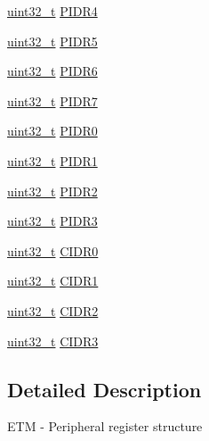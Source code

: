 \begin{DoxyCompactItemize}
\item 
\hyperlink{_p_e___types_8h_a33594304e786b158f3fb30289278f5af}{uint32\+\_\+t} \hyperlink{struct_e_t_m___mem_map_a5ee81b650eb5614f457473769ea8fb89}{P\+I\+D\+R4}
\item 
\hyperlink{_p_e___types_8h_a33594304e786b158f3fb30289278f5af}{uint32\+\_\+t} \hyperlink{struct_e_t_m___mem_map_abc897f6c82134908fb148e9283399e7c}{P\+I\+D\+R5}
\item 
\hyperlink{_p_e___types_8h_a33594304e786b158f3fb30289278f5af}{uint32\+\_\+t} \hyperlink{struct_e_t_m___mem_map_a2c8b019b70ddbec18c4ee65fa670f6f7}{P\+I\+D\+R6}
\item 
\hyperlink{_p_e___types_8h_a33594304e786b158f3fb30289278f5af}{uint32\+\_\+t} \hyperlink{struct_e_t_m___mem_map_ad50208a539be49c2689ceae20ad53af4}{P\+I\+D\+R7}
\item 
\hyperlink{_p_e___types_8h_a33594304e786b158f3fb30289278f5af}{uint32\+\_\+t} \hyperlink{struct_e_t_m___mem_map_a8e28324e300b4ce198839c4365ac2c19}{P\+I\+D\+R0}
\item 
\hyperlink{_p_e___types_8h_a33594304e786b158f3fb30289278f5af}{uint32\+\_\+t} \hyperlink{struct_e_t_m___mem_map_a2b4d5fe9290dc96888a3c8361ff0b1cb}{P\+I\+D\+R1}
\item 
\hyperlink{_p_e___types_8h_a33594304e786b158f3fb30289278f5af}{uint32\+\_\+t} \hyperlink{struct_e_t_m___mem_map_a60875d0450fd0cc4953bf5551153dc24}{P\+I\+D\+R2}
\item 
\hyperlink{_p_e___types_8h_a33594304e786b158f3fb30289278f5af}{uint32\+\_\+t} \hyperlink{struct_e_t_m___mem_map_a43bc7f48732725721d1af673497aeb3b}{P\+I\+D\+R3}
\item 
\hyperlink{_p_e___types_8h_a33594304e786b158f3fb30289278f5af}{uint32\+\_\+t} \hyperlink{struct_e_t_m___mem_map_a289eea9e2103e42ed73809a60b78a83c}{C\+I\+D\+R0}
\item 
\hyperlink{_p_e___types_8h_a33594304e786b158f3fb30289278f5af}{uint32\+\_\+t} \hyperlink{struct_e_t_m___mem_map_abc79da95babee680c540cbbc4cfa35fe}{C\+I\+D\+R1}
\item 
\hyperlink{_p_e___types_8h_a33594304e786b158f3fb30289278f5af}{uint32\+\_\+t} \hyperlink{struct_e_t_m___mem_map_ad374b6ac57c02483f0c5a5ad2db6dd5e}{C\+I\+D\+R2}
\item 
\hyperlink{_p_e___types_8h_a33594304e786b158f3fb30289278f5af}{uint32\+\_\+t} \hyperlink{struct_e_t_m___mem_map_a9c6bb1acae3c766482e230468863dcd6}{C\+I\+D\+R3}
\end{DoxyCompactItemize}


\subsection{Detailed Description}
E\+TM -\/ Peripheral register structure 

